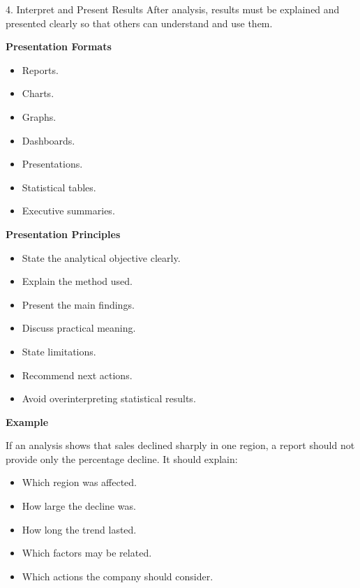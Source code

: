 \documentclass[aspectratio=169,11pt]{beamer}
\begin{document}
\begin{frame}[allowframebreaks]{4. Interpret and Present Results}
\footnotesize
After analysis, results must be explained and presented clearly so that others can understand and use them.\par\medskip
\textbf{Presentation Formats}\par\medskip
\begin{itemize}
\item Reports.
\item Charts.
\item Graphs.
\item Dashboards.
\item Presentations.
\item Statistical tables.
\item Executive summaries.
\end{itemize}
\textbf{Presentation Principles}\par\medskip
\begin{itemize}
\item State the analytical objective clearly.
\item Explain the method used.
\item Present the main findings.
\item Discuss practical meaning.
\item State limitations.
\item Recommend next actions.
\item Avoid overinterpreting statistical results.
\end{itemize}
\textbf{Example}\par\medskip
If an analysis shows that sales declined sharply in one region, a report should not provide only the percentage decline. It should explain:\par\medskip
\begin{itemize}
\item Which region was affected.
\item How large the decline was.
\item How long the trend lasted.
\item Which factors may be related.
\item Which actions the company should consider.
\end{itemize}
\end{frame}
\end{document}
